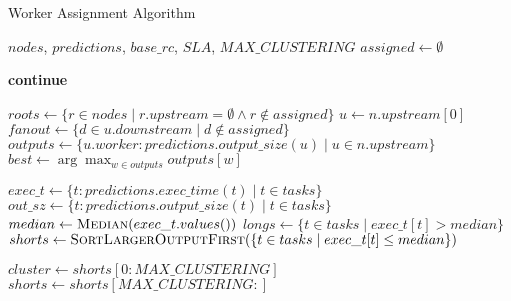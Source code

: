 \documentclass[conference]{IEEEtran}
\begin{document}
\begin{algorithm}
    \caption{Worker Assignment Algorithm}
    \label{alg:worker_assignment}
    \small
    \begin{algorithmic}[1]
    \Require $nodes$, $predictions$, $base\_rc$, $SLA$, $MAX\_CLUSTERING$
    \State $assigned \gets \emptyset$
    
            \State \textbf{continue}
        \EndIf
        
         
            \State $roots \gets \{r \in nodes \mid r.upstream = \emptyset \land r \notin assigned\}$
            \State {}
         
            \State $u \gets n.upstream[0]$
                \State {} 
            \Else {}
                \State $fanout \gets \{d \in u.downstream \mid d \notin assigned\}$
                \State {}
            \EndIf
        \Else {}
            \State $outputs \gets \{u.worker: predictions.output\_size(u) \mid u \in n.upstream\}$
            \State $best \gets \arg\max_{w \in outputs} outputs[w]$
            \State {}
        \EndIf
    \EndFor
    
    \Statex
    
            \Return
        \EndIf
        
        \State $exec\_t \gets \{t: predictions.exec\_time(t) \mid t \in tasks\}$
        \State $out\_sz \gets \{t: predictions.output\_size(t) \mid t \in tasks\}$
        \State $median \gets \textsc{Median}(exec\_t.values())$
        \State $longs \gets \{t \in tasks \mid exec\_t[t] > median\}$
        \State $shorts \gets \textsc{SortLargerOutputFirst}(\{t \in tasks \mid exec\_t[t] \leq median\})$
        
        \Statex
        \State {}
            \State $cluster \gets shorts[0:MAX\_CLUSTERING]$
            \State {}
            \State $shorts \gets shorts[MAX\_CLUSTERING:]$
        \EndIf
        

\end{algorithmic}
\end{algorithm}
\end{document}
